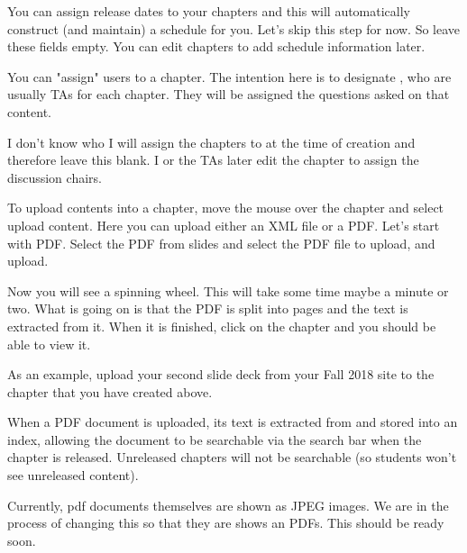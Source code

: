 \begin{gram}  
You can assign release dates to your chapters and this will
automatically construct (and maintain) a schedule for you.  Let's skip
this step for now.  So leave these fields empty.  You can edit
chapters to add schedule information later.
\end{gram}


\begin{gram}
You can "assign" users to a chapter.  The intention here is to
designate , who are usually TAs for each
chapter. 
%
They will be assigned the questions asked on that content.

I don't know who I will assign the chapters to at the time of creation and therefore leave this blank.  I or the TAs later edit the chapter to assign the discussion chairs. 
\end{gram}

\begin{gram}
\label{guide:chapter::upload}
To upload contents into a chapter, move the mouse over the chapter and
select upload content.  Here you can upload either an XML
file or a PDF.  Let's start with PDF.  Select the PDF from
slides and select the PDF file to upload, and upload.  

Now you will see a spinning wheel.  This will take some time maybe a
minute or two.  What is going on is that the PDF is split into pages
and the text is extracted from it.  When it is finished, click on the
chapter and you should be able to view it.  

As an example, upload your second slide deck from your Fall 2018 site to the chapter that you have created above.
\end{gram}

\begin{important}
When a PDF document is uploaded, its text is extracted from and stored into an index, allowing the document to be searchable via the search bar when the chapter is released.
%
Unreleased chapters will not be searchable (so students won't see
unreleased content).
\end{important}

\begin{note}
Currently, pdf documents themselves are shown as JPEG images.  We are in the process of changing this so that they are shows an PDFs.  This should be ready soon.
\end{note}


